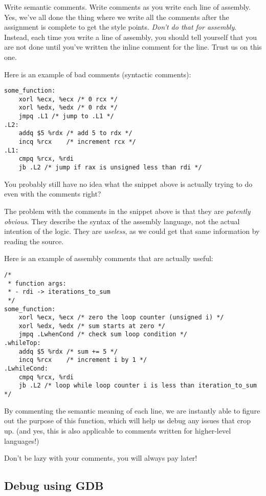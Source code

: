 \documentclass[11pt]{article}
\begin{document}
Write semantic comments. Write comments as you write each line of assembly. Yes, we've all
done the thing where we write all the comments after the assignment is complete to get the
style points. \emph{Don't do that for assembly}. Instead, each time you write a line of assembly,
you should tell yourself that you are not done until you've written the inline comment for
the line. Trust us on this one.

Here is an example of bad comments (syntactic comments):

\begin{lstlisting}
some_function:
    xorl %ecx, %ecx /* 0 rcx */
    xorl %edx, %edx /* 0 rdx */
    jmpq .L1 /* jump to .L1 */
.L2:
    addq $5 %rdx /* add 5 to rdx */
    incq %rcx    /* increment rcx */
.L1:
    cmpq %rcx, %rdi
    jb .L2 /* jump if rax is unsigned less than rdi */
\end{lstlisting}

You probably still have no idea what the snippet above is actually trying to do even with
the comments right?

The problem with the comments in the snippet above is that they are \emph{patently
obvious}. They describe the syntax of the assembly language, not the actual intention of
the logic. They are \emph{useless}, as we could get that same  information by reading the
source.

Here is an example of assembly comments that are actually useful:

\begin{lstlisting}
/*
 * function args:
 * - rdi -> iterations_to_sum
 */
some_function:
    xorl %ecx, %ecx /* zero the loop counter (unsigned i) */
    xorl %edx, %edx /* sum starts at zero */
    jmpq .LwhenCond /* check sum loop condition */
.whileTop:
    addq $5 %rdx /* sum += 5 */
    incq %rcx    /* increment i by 1 */
.LwhileCond:
    cmpq %rcx, %rdi
    jb .L2 /* loop while loop counter i is less than iteration_to_sum */
\end{lstlisting}

By commenting the semantic meaning of each line, we are instantly able to figure out the
purpose of this function, which will help us debug any issues that crop up. (and yes, this
is also applicable to comments written for higher-level languages!)

Don't be lazy with your comments, you will always pay later!

\subsection{Debug using GDB}
\end{document}
